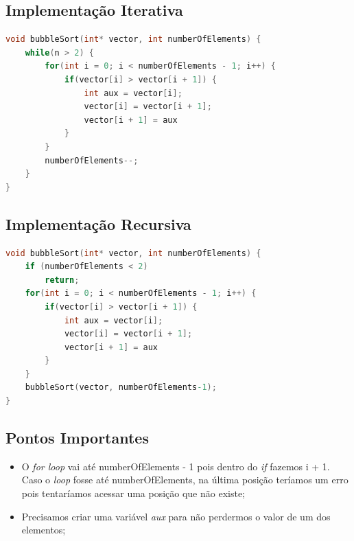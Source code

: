 \subsection{Implementação Iterativa}
\begin{lstlisting}[language=C]
void bubbleSort(int* vector, int numberOfElements) {
    while(n > 2) {
        for(int i = 0; i < numberOfElements - 1; i++) {
            if(vector[i] > vector[i + 1]) {
                int aux = vector[i];
                vector[i] = vector[i + 1];
                vector[i + 1] = aux
            }
        }
        numberOfElements--;
    }
}
\end{lstlisting}

\subsection{Implementação Recursiva}
\begin{lstlisting}[language=C]
void bubbleSort(int* vector, int numberOfElements) {
    if (numberOfElements < 2)
        return;
    for(int i = 0; i < numberOfElements - 1; i++) {
        if(vector[i] > vector[i + 1]) {
            int aux = vector[i];
            vector[i] = vector[i + 1];
            vector[i + 1] = aux
        }
    }
    bubbleSort(vector, numberOfElements-1);
}
\end{lstlisting}

\subsection{Pontos Importantes}
\begin{itemize}
    \item O \textit{for loop} vai até numberOfElements - 1 pois dentro do \textit{if} fazemos i + 1. Caso o \textit{loop} fosse até numberOfElements, na última posição teríamos um erro pois tentaríamos acessar uma posição que não existe; 
    
    \item Precisamos criar uma variável \textit{aux} para não perdermos o valor de um dos elementos;
\end{itemize}
